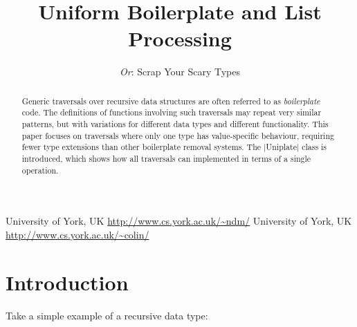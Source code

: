 \documentclass[preprint]{sigplanconf}
\newenvironment{code}{\begin{alltt}\small}{\end{alltt}}
\begin{document}
\copyrightdata{[to be supplied]}

\titlebanner{\today{} - \currenttime{}}        %
\preprintfooter{}   %

\title{Uniform Boilerplate and List Processing}
\subtitle{\textit{Or}: Scrap Your Scary Types}

           {University of York, UK}
           {\url{http://www.cs.york.ac.uk/~ndm/}}
           {University of York, UK}
           {\url{http://www.cs.york.ac.uk/~colin/}}

\maketitle

\begin{abstract}
Generic traversals over recursive data structures are often referred to as \textit{boilerplate} code. The definitions of functions involving such traversals may repeat very similar patterns, but with variations for different data types and different functionality. This paper focuses on traversals where only one type has value-specific behaviour, requiring fewer type extensions than other boilerplate removal systems. The |Uniplate| class is introduced, which shows how all traversals can implemented in terms of a single operation.
\end{abstract}

\section{Introduction}

Take a simple example of a recursive data type:
\end{document}
